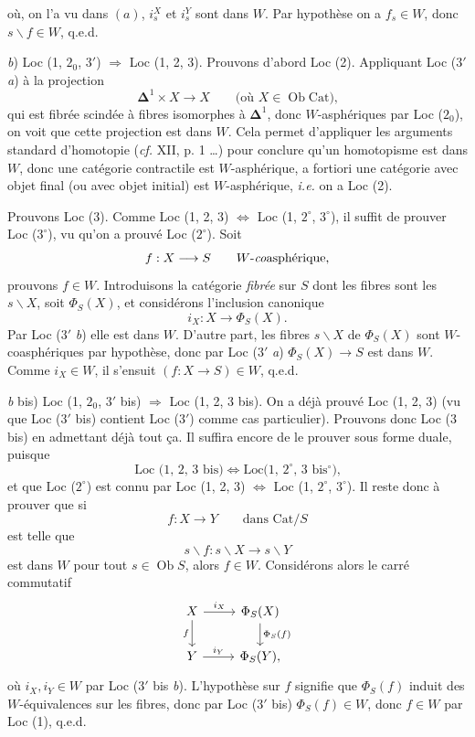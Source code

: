 \documentclass[11pt]{article}
\newcommand{\printedpage}[1]{\marginpar{\footnotesize p.~#1}}
\newcommand{\msp}[1]{\marginpar{\footnotesize [#1]}}
\begin{document}
\setcounter{footnote}{2}

\printedpage{4}
où, on l'a vu dans $(a)$, $i_s^X$ et $i_s^Y$ sont dans $W$. Par hypothèse on a $f_s \in W$, donc $s\backslash f \in W$, q.e.d.

\textit{b}) Loc (1, $2_0$, $3'$) $\Longrightarrow$ Loc (1, 2, 3). Prouvons d'abord Loc (2). Appliquant Loc ($3'$ \textit{a}) à la projection
\[
\boldsymbol{\Delta}^1 \times X \longrightarrow X \qquad \text{(où $X \in \operatorname{Ob}\mathrm{Cat}$),}
\]
qui est fibrée scindée à fibres isomorphes à $\boldsymbol{\Delta}^1$, donc $W$-asphériques par Loc ($2_0$), on voit que cette projection est dans $W$. Cela permet d'appliquer les arguments standard d'homotopie (\textit{cf.} XII, p. 1 \ldots) pour conclure qu'un homotopisme est dans $W$, donc une catégorie contractile est $W$-asphérique, a fortiori une catégorie avec objet final (ou avec objet initial) est $W$-asphérique, \textit{i.e.} on a Loc (2).

Prouvons Loc (3). Comme Loc (1, 2, 3) $\Longleftrightarrow$ Loc (1, $2^\circ$, $3^\circ$), il suffit de prouver Loc ($3^\circ$), vu qu'on a prouvé Loc ($2^\circ$). Soit
\[
f : X \longrightarrow S \qquad \text{$W$-\textit{co}asphérique,}
\]
prouvons $f \in W$. Introduisons la catégorie \textit{fibrée} sur $S$ dont les fibres sont les $s\backslash X$, soit $\Phi_S(X)$, et considérons l'inclusion canonique
\[
i_X : X \longrightarrow \Phi_S(X).
\]
\msp{page 7}Par Loc ($3'$ \textit{b}) elle est dans $W$. D'autre part, les fibres $s\backslash X$ de $\Phi_S(X)$ sont $W$-coasphériques par hypothèse, donc par Loc ($3'$ \textit{a}) $\Phi_S(X) \longrightarrow S$ est dans $W$. Comme $i_X \in W$, il s'ensuit $(f : X \longrightarrow S) \in W$, q.e.d.

\textit{b} bis) Loc (1, $2_0$, $3'$ bis) $\Longrightarrow$ Loc (1, 2, 3 bis). On a déjà prouvé Loc (1, 2, 3) (vu que Loc ($3'$ bis) contient Loc ($3'$) comme cas particulier). Prouvons donc Loc (3 bis) en admettant déjà tout ça. Il suffira encore de le prouver sous forme duale, puisque
\[
\text{Loc (1, 2, 3 bis)} \iff \text{Loc(1, $2^\circ$, 3 bis$^\circ$),}
\]
\msp{page 8}et que Loc ($2^\circ$) est connu par Loc (1, 2, 3) $\Longleftrightarrow$ Loc (1, $2^\circ$, $3^\circ$). Il reste donc à prouver que si
\[
f : X \longrightarrow Y \qquad \text{dans } \mathrm{Cat}/S
\]
est telle que
\[
s\backslash f : s\backslash X \longrightarrow s\backslash Y
\]
est dans $W$ pour tout $s \in \operatorname{Ob} S$, alors $f \in W$. Considérons alors le carré commutatif
\[
\begin{tikzcd}
X \arrow[r, "i_X"] \arrow[d, "f"'] & \Phi_S(X) \arrow[d, "\Phi_S(f)"] \\
Y \arrow[r, "i_Y"] & \Phi_S(Y),
\end{tikzcd}
\]
où $i_X, i_Y \in W$ par Loc ($3'$ bis \textit{b}). L'hypothèse sur $f$ signifie que $\Phi_S(f)$ induit des $W$-équivalences sur les fibres, donc par Loc ($3'$ bis) $\Phi_S(f) \in W$, donc $f \in W$ par Loc (1), q.e.d.
\end{document}
